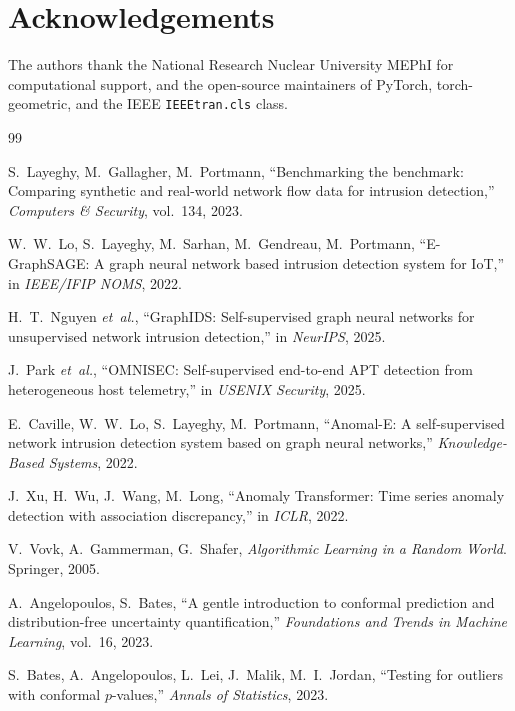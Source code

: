 \documentclass[journal,twoside]{IEEEtran}
\begin{document}
\section*{Acknowledgements}
The authors thank the National Research Nuclear University MEPhI for
computational support, and the open-source maintainers of PyTorch,
torch-geometric, and the IEEE \texttt{IEEEtran.cls} class.

\balance

\begin{thebibliography}{99}

S.~Layeghy, M.~Gallagher, M.~Portmann,
``Benchmarking the benchmark: Comparing synthetic and real-world network
flow data for intrusion detection,''
\emph{Computers \& Security}, vol.~134, 2023.

W.~W.~Lo, S.~Layeghy, M.~Sarhan, M.~Gendreau, M.~Portmann,
``E-GraphSAGE: A graph neural network based intrusion detection system
for IoT,'' in \emph{IEEE/IFIP NOMS}, 2022.

H.~T.~Nguyen \emph{et~al.},
``GraphIDS: Self-supervised graph neural networks for unsupervised
network intrusion detection,'' in \emph{NeurIPS}, 2025.

J.~Park \emph{et~al.},
``OMNISEC: Self-supervised end-to-end APT detection from heterogeneous
host telemetry,'' in \emph{USENIX Security}, 2025.

E.~Caville, W.~W.~Lo, S.~Layeghy, M.~Portmann,
``Anomal-E: A self-supervised network intrusion detection system based on
graph neural networks,'' \emph{Knowledge-Based Systems}, 2022.

J.~Xu, H.~Wu, J.~Wang, M.~Long,
``Anomaly Transformer: Time series anomaly detection with association
discrepancy,'' in \emph{ICLR}, 2022.

V.~Vovk, A.~Gammerman, G.~Shafer,
\emph{Algorithmic Learning in a Random World}.  Springer, 2005.

A.~Angelopoulos, S.~Bates,
``A gentle introduction to conformal prediction and distribution-free
uncertainty quantification,''
\emph{Foundations and Trends in Machine Learning}, vol.~16, 2023.

S.~Bates, A.~Angelopoulos, L.~Lei, J.~Malik, M.~I.~Jordan,
``Testing for outliers with conformal $p$-values,''
\emph{Annals of Statistics}, 2023.


\end{thebibliography}
\end{document}
